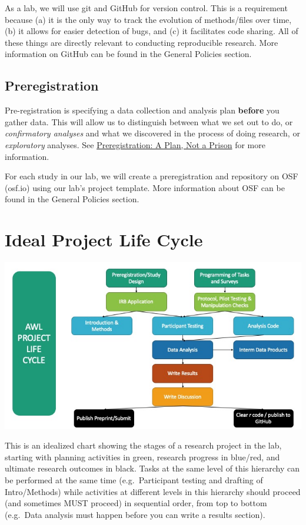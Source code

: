 \documentclass[
]{book}
\begin{document}
As a lab, we will use git and GitHub for version control. This is a requirement because (a) it is the only way to track the evolution of methods/files over time, (b) it allows for easier detection of bugs, and (c) it facilitates code sharing. All of these things are directly relevant to conducting reproducible research. More information on GitHub can be found in the General Policies section.

\hypertarget{preregistration}{%
\subsection{Preregistration}\label{preregistration}}

Pre-registration is specifying a data collection and analysis plan \textbf{before} you gather data. This will allow us to distinguish between what we set out to do, or \emph{confirmatory analyses} and what we discovered in the process of doing research, or \emph{exploratory} analyses. See \href{https://cos.io/blog/preregistration-plan-not-prison/}{Preregistration: A Plan, Not a Prison} for more information.

For each study in our lab, we will create a preregistration and repository on OSF (osf.io) using our lab's project template. More information about OSF can be found in the General Policies section.

\hypertarget{ideal-project-life-cycle}{%
\section{Ideal Project Life Cycle}\label{ideal-project-life-cycle}}

\includegraphics{images/PLC.jpg}

This is an idealized chart showing the stages of a research project in the lab, starting with planning activities in green, research progress in blue/red, and ultimate research outcomes in black. Tasks at the same level of this hierarchy can be performed at the same time (e.g.~Participant testing and drafting of Intro/Methods) while activities at different levels in this hierarchy should proceed (and sometimes MUST proceed) in sequential order, from top to bottom (e.g.~Data analysis must happen before you can write a results section).
\end{document}
